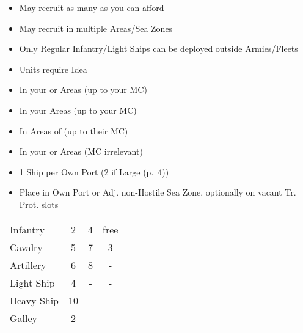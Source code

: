 \documentclass[10pt]{article}
\begin{document}
\begin{itemize}
	\item May recruit as many as you can afford
	\item May recruit in multiple Areas/Sea Zones
	\item Only Regular Infantry/Light Ships can be deployed outside Armies/Fleets
	\item {} Units require  Idea 
\end{itemize}
\begin{itemize}
	\item In your or \vassal Areas (up to your MC)
\end{itemize}
\begin{itemize}
	\item In your Areas (up to your MC)
	\item In Areas of \activeallies (up to their MC)
\end{itemize}
\begin{itemize}
	\item In your or \vassal Areas (MC irrelevant)
\end{itemize}
\begin{itemize}
	\item 1 Ship per Own Port (2 if Large (p.~4))
	\item {}Place in Own Port or Adj. non-Hostile Sea Zone, optionally on vacant Tr. Prot. slots
\end{itemize}
\begin{tabularx}{\columnwidth}{ | l | C | C | C | }
	\hline
	\null &   &   &   \\ \hline
	Infantry &  2\ducats &  4\ducats &  free \\ \hline
	Cavalry &  5\ducats &  7\ducats &  3\ducats \\ \hline
	Artillery &  6\ducats &  8\ducats & - \\ \hline
	Light Ship & 4\ducats & - & - \\ \hline
	Heavy Ship & 10\ducats & - & - \\ \hline
	Galley & 2\ducats & - & - \\ \hline
\end{tabularx}
\end{document}
